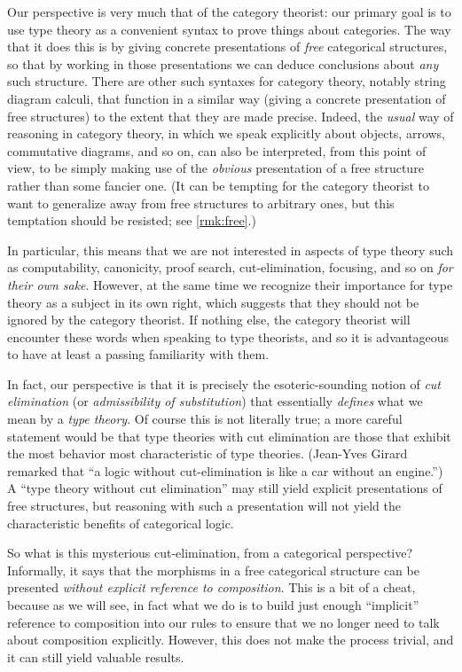 \documentclass{book}
\begin{document}
Our perspective is very much that of the category theorist: our primary goal is to use type theory as a convenient syntax to prove things about categories.
The way that it does this is by giving concrete presentations of \emph{free} categorical structures, so that by working in those presentations we can deduce conclusions about \emph{any} such structure.
There are other such syntaxes for category theory, notably string diagram calculi, that function in a similar way (giving a concrete presentation of free structures) to the extent that they are made precise.
Indeed, the \emph{usual} way of reasoning in category theory, in which we speak explicitly about objects, arrows, commutative diagrams, and so on, can also be interpreted, from this point of view, to be simply making use of the \emph{obvious} presentation of a free structure rather than some fancier one.
(It can be tempting for the category theorist to want to generalize away from free structures to arbitrary ones, but this temptation should be resisted; see \cref{rmk:free}.)

In particular, this means that we are not interested in aspects of type theory such as computability, canonicity, proof search, cut-elimination, focusing, and so on \emph{for their own sake}.
However, at the same time we recognize their importance for type theory as a subject in its own right, which suggests that they should not be ignored by the category theorist.
If nothing else, the category theorist will encounter these words when speaking to type theorists, and so it is advantageous to have at least a passing familiarity with them.

In fact, our perspective is that it is precisely the esoteric-sounding notion of \emph{cut elimination} (or \emph{admissibility of substitution}) that essentially \emph{defines} what we mean by a \emph{type theory}.
Of course this is not literally true; a more careful statement would be that type theories with cut elimination are those that exhibit the most behavior most characteristic of type theories.
(Jean-Yves Girard remarked that ``a logic without cut-elimination is like a car without an engine.'')
A ``type theory without cut elimination'' may still yield explicit presentations of free structures, but reasoning with such a presentation will not yield the characteristic benefits of categorical logic.

So what is this mysterious cut-elimination, from a categorical perspective?
Informally, it says that the morphisms in a free categorical structure can be presented \emph{without explicit reference to composition}.
This is a bit of a cheat, because as we will see, in fact what we do is to build just enough ``implicit'' reference to composition into our rules to ensure that we no longer need to talk about composition explicitly.
However, this does not make the process trivial, and it can still yield valuable results.
\end{document}
